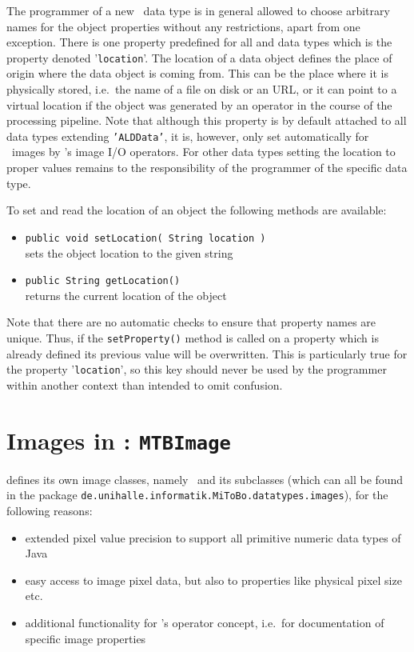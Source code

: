 The programmer of a new \mitobo\ data type is in general allowed to choose arbitrary names for
the object properties without any restrictions, apart from one exception. There is one property predefined for all
\alida and \mitobo data types which is the property denoted '{\tt location}'. The location
of a data object defines the place of origin where the data object is coming from. This can be the place where it is physically stored, i.e.~the name of a
file on disk or an URL, or it can point to a virtual location if the object was generated by an operator in the course
of the processing pipeline. Note that although this property is by default
attached to all data types extending {\tt 'ALDData'}, it is, however, only set
automatically for \mitobo\ images by \mitobo's image I/O operators. For other data types setting the location
to proper values remains to the responsibility of the programmer of
the specific data type. 

To set and read the location of an object the following methods are available:
\begin{itemize}
 	\item {\tt public void setLocation( String location )}\\
 		sets the object location to the given string
    \item {\tt public String getLocation() }\\
 		returns the current location of the object 
\end{itemize} 

Note that there are no automatic checks to ensure that property names are unique. Thus, if the {\tt setProperty()} method
is called on a property which is already defined its previous value will be overwritten. This is
particularly true for the property '{\tt location}', so this key should never be
used by the programmer within another context than intended to omit confusion.


\section{Images in \mitobo: {\tt MTBImage}}
\label{sec:MTBImage}	
\mitobo defines its own image classes, namely \mtbimg~and its subclasses (which can all be found in the package
{\tt de.unihalle.informatik.MiToBo.datatypes.images}), for the following reasons:
\begin{itemize}
  \item extended pixel value precision to support all primitive numeric
  data types of Java
  \item easy access to image pixel data, but also to properties like physical pixel
  size etc.
  \item additional functionality for \mitobo's operator concept, i.e.~for documentation of
  specific image properties
\end{itemize}

